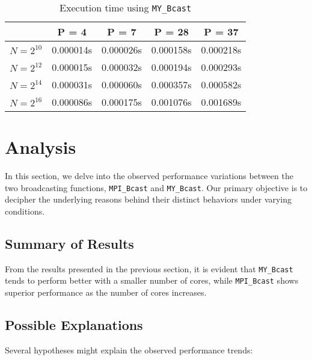 \documentclass[12pt,a4paper]{article}
\begin{document}
\begin{table}[!htb]
    \centering
    \begin{tabular}{|c|c|c|c|c|}
    \hline
    & P = 4 & P = 7 & P = 28 & P = 37 \\
    \hline
    $N = 2^{10}$ & 0.000014s & 0.000026s & 0.000158s & 0.000218s \\
    \hline
    $N = 2^{12}$ & 0.000015s & 0.000032s & 0.000194s & 0.000293s \\
    \hline
    $N = 2^{14}$ & 0.000031s & 0.000060s & 0.000357s & 0.000582s \\
    \hline
    $N = 2^{16}$ & 0.000086s & 0.000175s & 0.001076s & 0.001689s \\
    \hline
    \end{tabular}
    \caption{Execution time using \texttt{MY\_Bcast}}
\end{table}

\section{Analysis}

In this section, we delve into the observed performance variations between the two broadcasting functions, \texttt{MPI\_Bcast} and \texttt{MY\_Bcast}. Our primary objective is to decipher the underlying reasons behind their distinct behaviors under varying conditions.

\subsection{Summary of Results}
From the results presented in the previous section, it is evident that \texttt{MY\_Bcast} tends to perform better with a smaller number of cores, while \texttt{MPI\_Bcast} shows superior performance as the number of cores increases.

\subsection{Possible Explanations}
Several hypotheses might explain the observed performance trends:
\end{document}
